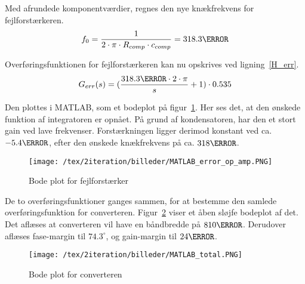 \noindent Med afrundede komponentværdier, regnes den nye knækfrekvens for fejlforstærkeren.
\begin{equation} \label{f_0}
f_0 = \frac{1}{2\cdot \pi \cdot R_{comp} \cdot c_{comp}} = 318.3\hertz
\end{equation}

\noindent Overføringsfunktionen for fejlforstærkeren kan nu opskrives ved ligning~\ref{H_err}.
\begin{equation} \label{H_err}
G_{err}(s) = (\frac{318.3\hertz \cdot 2\cdot\pi}{s} + 1) \cdot 0.535
\end{equation}

\noindent Den plottes i MATLAB, som et bodeplot på figur~\ref{fig:MATLAB_error_op_amp_2}. Her ses det, at den ønskede funktion af integratoren er opnået. På grund af kondensatoren, har den et stort gain ved lave frekvenser. Forstærkningen ligger derimod konstant ved ca. $-5.4\decibel$, efter den ønskede knækfrekvens på ca. $318\hertz$.

\begin{figure}[H]
	\center
	\texttt{[image: /tex/2iteration/billeder/MATLAB\_error\_op\_amp.PNG]}
	\caption{Bode plot for fejlforstærker}
	\label{fig:MATLAB_error_op_amp_2}
\end{figure}

\noindent De to overføringsfunktioner ganges sammen, for at bestemme den samlede overføringsfunktion for converteren. Figur~\ref{fig:MATLAB_total_2} viser et åben sløjfe bodeplot af det. Det aflæses at converteren vil have en båndbredde på $810\hertz$. Derudover aflæses fase-margin til $74.3^\circ$, og gain-margin til $24\decibel$.

\begin{figure}[H]
	\center
	\texttt{[image: /tex/2iteration/billeder/MATLAB\_total.PNG]}
	\caption{Bode plot for converteren}
	\label{fig:MATLAB_total_2}
\end{figure} 



